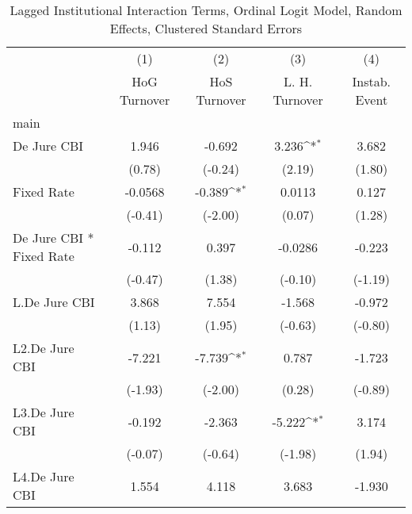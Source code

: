 {
\def\sym#1{\ifmmode^{#1}\else\(^{#1}\)\fi}
\begin{longtable}{l*{4}{c}}
\caption{Lagged Institutional Interaction Terms, Ordinal Logit Model, Random Effects, Clustered Standard Errors \label{intlagordLogLogDJ}}\\
\hline\hline\endfirsthead\hline\endhead\hline\endfoot\endlastfoot
                &\multicolumn{1}{c}{(1)}&\multicolumn{1}{c}{(2)}&\multicolumn{1}{c}{(3)}&\multicolumn{1}{c}{(4)}\\
                &\multicolumn{1}{c}{HoG Turnover}&\multicolumn{1}{c}{HoS Turnover}&\multicolumn{1}{c}{L. H. Turnover}&\multicolumn{1}{c}{Instab. Event}\\
\hline
main            &                  &                  &                  &                  \\
De Jure CBI     &    1.946         &   -0.692         &    3.236\sym{*}  &    3.682         \\
                &   (0.78)         &  (-0.24)         &   (2.19)         &   (1.80)         \\
[1em]
Fixed Rate      &  -0.0568         &   -0.389\sym{*}  &   0.0113         &    0.127         \\
                &  (-0.41)         &  (-2.00)         &   (0.07)         &   (1.28)         \\
[1em]
De Jure CBI * Fixed Rate&   -0.112         &    0.397         &  -0.0286         &   -0.223         \\
                &  (-0.47)         &   (1.38)         &  (-0.10)         &  (-1.19)         \\
[1em]
L.De Jure CBI   &    3.868         &    7.554         &   -1.568         &   -0.972         \\
                &   (1.13)         &   (1.95)         &  (-0.63)         &  (-0.80)         \\
[1em]
L2.De Jure CBI  &   -7.221         &   -7.739\sym{*}  &    0.787         &   -1.723         \\
                &  (-1.93)         &  (-2.00)         &   (0.28)         &  (-0.89)         \\
[1em]
L3.De Jure CBI  &   -0.192         &   -2.363         &   -5.222\sym{*}  &    3.174         \\
                &  (-0.07)         &  (-0.64)         &  (-1.98)         &   (1.94)         \\
[1em]
L4.De Jure CBI  &    1.554         &    4.118         &    3.683         &   -1.930         \\

\end{longtable}}
